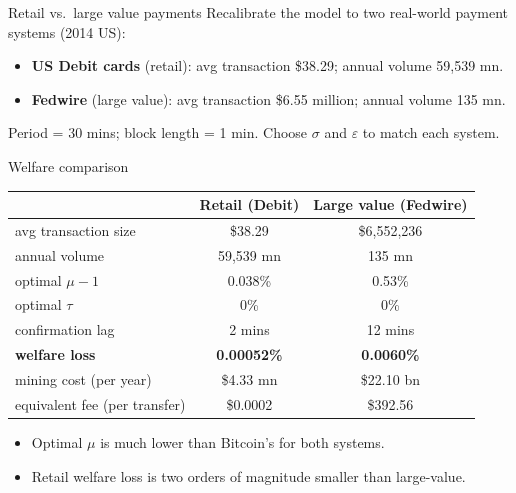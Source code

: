 \documentclass[aspectratio=169,xcolor=dvipsnames]{beamer}
\begin{document}
\begin{frame}{Retail vs.\ large value payments}
    Recalibrate the model to two real-world payment systems (2014 US):
    \vspace{2mm}
    \begin{itemize}
        \item \textbf{US Debit cards} (retail): avg transaction \$38.29; annual volume 59{,}539 mn.
        \item \textbf{Fedwire} (large value): avg transaction \$6.55 million; annual volume 135 mn.
    \end{itemize}
    \vspace{3mm}
    Period = 30 mins; block length = 1 min. Choose $\sigma$ and $\varepsilon$ to match each system.
\end{frame}

\begin{frame}{Welfare comparison}
    \centering
    \small
    \begin{tabular}{lcc}
        \hline
        & Retail (Debit) & Large value (Fedwire) \\
        \hline
        avg transaction size & \$38.29 & \$6{,}552{,}236 \\
        annual volume & 59{,}539 mn & 135 mn \\
        optimal $\mu - 1$ & 0.038\% & 0.53\% \\
        optimal $\tau$ & 0\% & 0\% \\
        confirmation lag & 2 mins & 12 mins \\
        \textbf{welfare loss} & \textbf{0.00052\%} & \textbf{0.0060\%} \\
        mining cost (per year) & \$4.33 mn & \$22.10 bn \\
        equivalent fee (per transfer) & \$0.0002 & \$392.56 \\
        \hline
    \end{tabular}
    \vspace{2mm}
    \begin{itemize}
        \item Optimal $\mu$ is much lower than Bitcoin's for both systems.
        \item Retail welfare loss is two orders of magnitude smaller than large-value.
    \end{itemize}
\end{frame}
\end{document}
